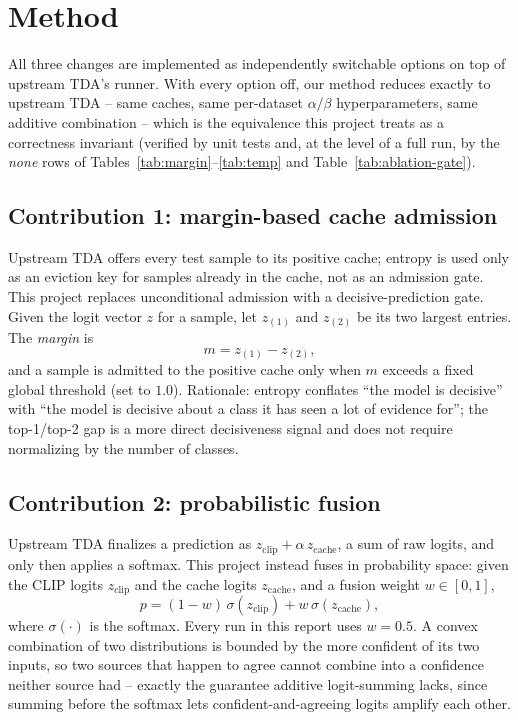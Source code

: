 \section{Method}
\label{sec:method}

All three changes are implemented as independently switchable options on top of upstream
TDA's runner. With every option off, our method reduces exactly to upstream TDA -- same caches,
same per-dataset $\alpha/\beta$ hyperparameters, same additive combination -- which is the
equivalence this project treats as a correctness invariant (verified by unit tests and, at the
level of a full run, by the \emph{none} rows of Tables~\ref{tab:margin}--\ref{tab:temp} and
Table~\ref{tab:ablation-gate}).

\subsection{Contribution 1: margin-based cache admission}

Upstream TDA offers every test sample to its positive cache; entropy is used only as an
eviction key for samples already in the cache, not as an admission gate. This project replaces
unconditional admission with a decisive-prediction gate. Given the logit vector $z$ for a
sample, let $z_{(1)}$ and $z_{(2)}$ be its two largest entries. The \emph{margin} is
\begin{equation}
    m = z_{(1)} - z_{(2)},
\end{equation}
and a sample is admitted to the positive cache only when $m$ exceeds a fixed global threshold
(set to $1.0$). Rationale: entropy conflates ``the model is decisive''
with ``the model is decisive about a class it has seen a lot of evidence for''; the top-1/top-2
gap is a more direct decisiveness signal and does not require normalizing by the number of
classes.

\subsection{Contribution 2: probabilistic fusion}

Upstream TDA finalizes a prediction as $z_{\text{clip}} + \alpha \, z_{\text{cache}}$, a sum of
raw logits, and only then applies a softmax. This project instead fuses in probability space:
given the CLIP logits $z_{\text{clip}}$ and the cache logits $z_{\text{cache}}$, and a fusion
weight $w \in [0, 1]$,
\begin{equation}
    p = (1 - w)\, \sigma(z_{\text{clip}}) + w\, \sigma(z_{\text{cache}}), \label{eq:fusion}
\end{equation}
where $\sigma(\cdot)$ is the softmax. Every run in this report uses $w = 0.5$. A convex
combination of two distributions is bounded by
the more confident of its two inputs, so two sources that happen to agree cannot combine into
a confidence neither source had -- exactly the guarantee additive logit-summing lacks, since
summing before the softmax lets confident-and-agreeing logits amplify each other.

